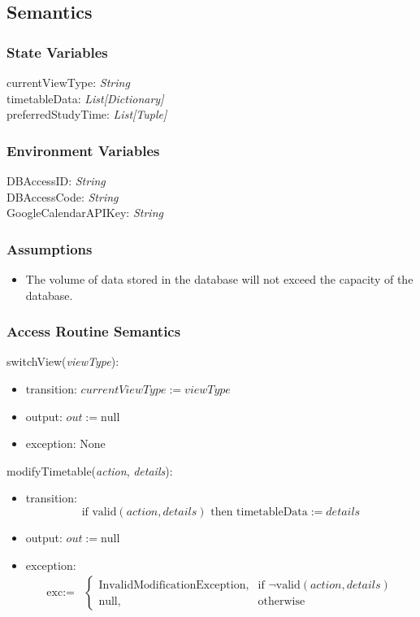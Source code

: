 \documentclass[12pt, titlepage]{article}
\begin{document}
\subsection{Semantics}

\subsubsection{State Variables}

currentViewType: \textit{String}\\
timetableData: \textit{List[Dictionary]}\\
preferredStudyTime: \textit{List[Tuple]}\\


\subsubsection{Environment Variables}

DBAccessID: \textit{String}\\
DBAccessCode: \textit{String}\\
GoogleCalendarAPIKey: \textit{String}


\subsubsection{Assumptions}

\begin{itemize}
  \item The volume of data stored in the database will not exceed the capacity of the database.
\end{itemize}

\subsubsection{Access Routine Semantics}

\noindent switchView(\textit{viewType}):
\begin{itemize}
\item transition: \( currentViewType := \textit{viewType} \)
\item output: \( out := \text{null} \)
\item exception: None
\end{itemize}

\noindent modifyTimetable(\textit{action}, \textit{details}):
\begin{itemize}
\item transition: 
\[
\text{if } \text{valid}(\textit{action}, \textit{details}) \text{ then } \text{timetableData} := \textit{details}
\]
\item output: \( out := \text{null} \)
\item exception: 
\[
\begin{array}{ll}
\text{exc} := & \begin{cases}
\text{InvalidModificationException}, & \text{if } \neg \text{valid}(\textit{action}, \textit{details}) \\
\text{null}, & \text{otherwise}
\end{cases}
\end{array}
\]
\end{itemize}
\end{document}
